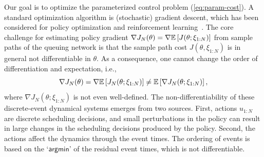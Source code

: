 Our goal is to optimize the parameterized control problem (\ref{eq:param-cost}). A standard optimization algorithm is (stochastic) gradient descent, which has been considered for policy optimization and reinforcement learning~\cite{sutton1999policy, baird1998gradient}. The core challenge for estimating policy gradient $\nabla J_{N}(\theta) = \nabla\mathbb{E}\left[J(\theta;\xi_{1:N})\right]$ from sample paths of the queuing network is that the sample path cost $J(\theta, \xi_{1:N})$ is in general not differentiable in $\theta$. As a consequence, one cannot change the order of differentiation and expectation, i.e.,
\[
\nabla J_{N}(\theta)=\nabla\mathbb{E}\left[J_{N}(\theta;\xi_{1:N})\right]\ne\mathbb{E}\left[\nabla J_{N}(\theta;\xi_{1:N})\right],
\]
where $\nabla J_{N}(\theta;\xi_{1:N})$ is not even well-defined.
The non-differentiability of these discrete-event dynamical systems emerges from two sources. First, actions $u_{1:N}$ are discrete scheduling decisions, and small perturbations in the policy can result in large changes in the scheduling decisions produced by the policy. Second, the actions affect the dynamics through the event times. The ordering of events is based on the `$\mathsf{argmin}$' of the residual event times, which is not differentiable.

